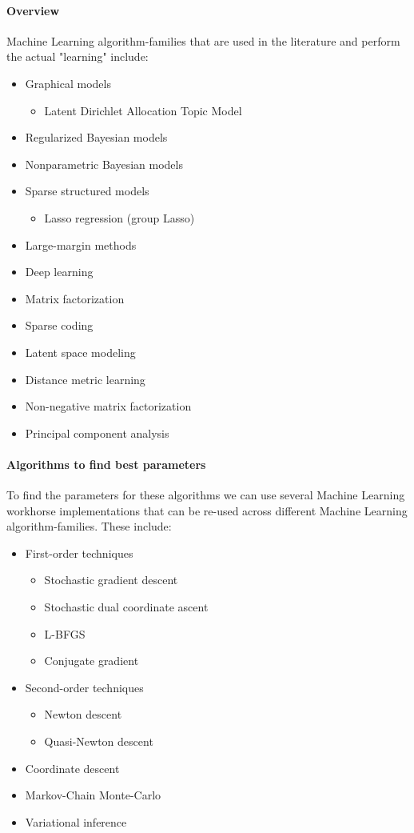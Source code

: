 \paragraph{Overview}
Machine Learning algorithm-families that are used in the literature and perform the actual "learning" include:
\begin{itemize}
	\item Graphical models \cite{Wain08}\cite{Kol09}\cite{Xin16}
	\begin{itemize}
		\item Latent Dirichlet Allocation Topic Model \cite{Blei03}
	\end{itemize}
	\item Regularized Bayesian models \cite{Zhu09}\cite{Zhu09-2}\cite{Zhu14}
	\item Nonparametric Bayesian models \cite{Grif05}\cite{Teh06}
	\item Sparse structured models
	\begin{itemize}
		\item Lasso regression (group Lasso)
	\end{itemize}
	\item Large-margin methods
	\item Deep learning
	\item Matrix factorization
	\item Sparse coding
	\item Latent space modeling
	\item Distance metric learning
	\item Non-negative matrix factorization
	\item Principal component analysis
\end{itemize}


\paragraph{Algorithms to find best parameters}
To find the parameters for these algorithms we can use several Machine Learning workhorse implementations that can be re-used across different Machine Learning algorithm-families. These include:
\begin{itemize}
	\item First-order techniques
	\begin{itemize}
		\item Stochastic gradient descent
		\item Stochastic dual coordinate ascent\cite{Shal13}
		\item L-BFGS
		\item Conjugate gradient
	\end{itemize}
	\item Second-order techniques
	\begin{itemize}
		\item Newton descent
		\item Quasi-Newton descent
	\end{itemize}
	\item Coordinate descent
	\item Markov-Chain Monte-Carlo
	\item Variational inference
\end{itemize}


